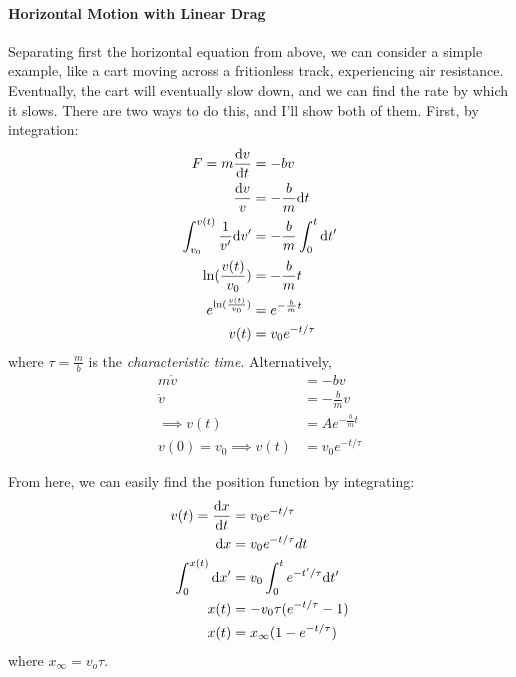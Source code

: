 \documentclass[a4paper]{article}
\begin{document}
\paragraph{Horizontal Motion with Linear Drag}
Separating first the horizontal equation from above, we can consider a simple
example, like a cart moving across a fritionless track, experiencing air
resistance. Eventually, the cart will eventually slow down, and we can find
the rate by which it slows. There are two ways to do this, and I'll show both
of them. First, by integration:
\begin{align*}
    F = m\frac{\mathrm{d} v}{\mathrm{d} t} &= -bv\\
        \frac{\mathrm{d} v}{v} &= -\frac{b}{m}\mathrm{d} t\\
        \int_{v_0}^{v(t)} \frac{1}{v'}\mathrm{d} v' &= -\frac{b}{m}
        \int_0^t \mathrm{d} t'\\
        \ln(\frac{v(t)}{v_0}) &= -\frac{b}{m}t\\
        e^{\ln(\frac{v(t)}{v_0})}&=e^{-\frac{b}{m}t}\\
        v(t) &= v_0e^{-{t}/{\tau}}
\end{align*}
where $\tau = \frac{m}{b}$ is the \emph{characteristic time}. Alternatively,
\begin{align*}
    m\dot{v} &= -bv\\
    \dot{v} &= -\frac{b}{m}v\\
    \implies v(t) &= Ae^{-\frac{b}{m}t}\\
    v(0)=v_0 \implies v(t) &= v_0e^{-t/\tau}
\end{align*}

From here, we can easily find the position function by integrating:
\begin{align*}
    v(t) = \frac{\mathrm{d} x}{\mathrm{d} t} &= v_0e^{-t/\tau}\\
    \mathrm{d} x &= v_0 e^{-t/\tau}dt\\
    \int_0^{x(t)}\mathrm{d} x' &= v_0\int_0^t e^{-t'/\tau}\mathrm{d} t'\\
    x(t) &= -v_0\tau(e^{-t/\tau}-1)\\
    x(t) &= x_{\infty}(1-e^{-t/\tau})
\end{align*}
where $x_{\infty} = v_o\tau$.
\end{document}
